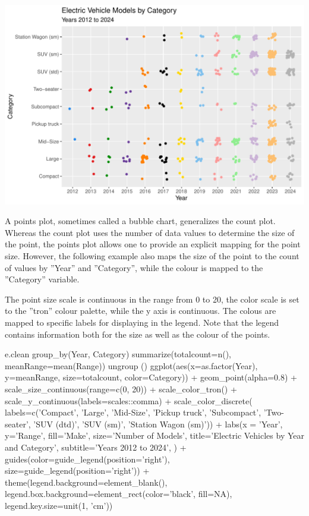 \begin{center}
  \includegraphics[width=.8\textwidth]{fuel.jitterdiscrete.pdf}
\end{center}

A points plot, sometimes called a bubble chart, generalizes the count plot. Whereas the count plot uses the number of data values to determine the size of the point, the points plot allows one to provide an explicit mapping for the point size. However, the following example also maps the size of the point to the count of values by ''Year'' and ''Category'', while the colour is mapped to the ''Category'' variable. 

The point size scale is continuous in the range from 0 to 20, the color scale is set to the ''tron'' colour palette, while the y axis is continuous. The colous are mapped to specific labels for displaying in the legend. Note that the legend contains information both for the size as well as the colour of the points.

\begin{samepage}
\begin{Rcode}
e.clean %
  group_by(Year, Category) %
  summarize(totalcount=n(), meanRange=mean(Range)) %
  ungroup () %
ggplot(aes(x=as.factor(Year), y=meanRange, 
           size=totalcount, color=Category)) +
  geom_point(alpha=0.8) +
  scale_size_continuous(range=c(0, 20)) +
  scale_color_tron() + 
  scale_y_continuous(labels=scales::comma) + 
  scale_color_discrete(
     labels=c('Compact', 'Large', 'Mid-Size', 'Pickup truck', 
              'Subcompact', 'Two-seater', 'SUV (dtd)', 
              'SUV (sm)', 'Station Wagon (sm)')) + 
  labs(x = 'Year', y='Range', 
       fill='Make', size='Number of Models', 
       title='Electric Vehicles by Year and Category', 
       subtitle='Years 2012 to 2024', ) +
  guides(color=guide_legend(position='right'), 
         size=guide_legend(position='right')) +
  theme(legend.background=element_blank(), 
        legend.box.background=element_rect(color='black', fill=NA),
        legend.key.size=unit(1, 'cm')) 
\end{Rcode}
\end{samepage}

